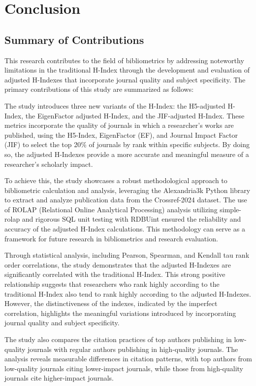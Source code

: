 \chapter{Conclusion}
\label{ch:conclusion}

\section{Summary of Contributions}

This research contributes to the field of bibliometrics by addressing
noteworthy limitations in the traditional H-Index through the development and
evaluation of adjusted H-Indexes that incorporate journal quality and subject
specificity. The primary contributions of this study are summarized as follows:

The study introduces three new variants of the H-Index: the H5-adjusted
H-Index, the EigenFactor adjusted H-Index, and the JIF-adjusted H-Index. These
metrics incorporate the quality of journals in which a researcher’s works are
published, using the H5-Index, EigenFactor (EF), and Journal Impact Factor
(JIF) to select the top 20\% of journals by rank within specific subjects. By
doing so, the adjusted H-Indexes provide a more accurate and meaningful measure
of a researcher’s scholarly impact.

To achieve this, the study showcases a robust methodological approach to
bibliometric calculation and analysis, leveraging the Alexandria3k Python
library to extract and analyze publication data from the Crossref-2024 dataset.
The use of ROLAP (Relational Online Analytical Processing) analysis utilizing
simple-rolap and rigorous SQL unit testing with RDBUint ensured the reliability
and accuracy of the adjusted H-Index calculations. This methodology can serve
as a framework for future research in bibliometrics and research evaluation.

Through statistical analysis, including Pearson, Spearman, and Kendall tau rank
order correlations, the study demonstrates that the adjusted H-Indexes are
significantly correlated with the traditional H-Index. This strong positive
relationship suggests that researchers who rank highly according to the
traditional H-Index also tend to rank highly according to the adjusted
H-Indexes. However, the distinctiveness of the indexes, indicated by the
imperfect correlation, highlights the meaningful variations introduced by
incorporating journal quality and subject specificity.

The study also compares the citation practices of top authors publishing in
low-quality journals with regular authors publishing in high-quality journals.
The analysis reveals measurable differences in citation patterns, with top
authors from low-quality journals citing lower-impact journals, while those
from high-quality journals cite higher-impact journals.

